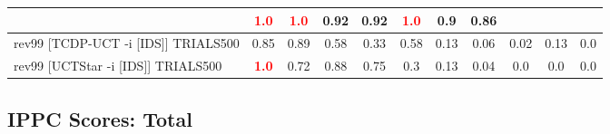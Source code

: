 \documentclass{article}
\begin{document}
\begin{tabular}{|l|r@{$\pm$}rr@{$\pm$}rr@{$\pm$}rr@{$\pm$}rr@{$\pm$}rr@{$\pm$}rr@{$\pm$}rr@{$\pm$}rr@{$\pm$}rr@{$\pm$}r|}
& \multicolumn{2}{c}{\textbf{\textcolor{red}{1.0}}}
& \multicolumn{2}{c}{\textbf{\textcolor{red}{1.0}}}
& \multicolumn{2}{c}{0.92}
& \multicolumn{2}{c}{0.92}
& \multicolumn{2}{c}{\textbf{\textcolor{red}{1.0}}}
& \multicolumn{2}{c}{0.9}
& \multicolumn{2}{c|}{0.86}
\\
\hline
rev99 [TCDP-UCT -i [IDS]] TRIALS500
& \multicolumn{2}{c}{0.85}
& \multicolumn{2}{c}{0.89}
& \multicolumn{2}{c}{0.58}
& \multicolumn{2}{c}{0.33}
& \multicolumn{2}{c}{0.58}
& \multicolumn{2}{c}{0.13}
& \multicolumn{2}{c}{0.06}
& \multicolumn{2}{c}{0.02}
& \multicolumn{2}{c}{0.13}
& \multicolumn{2}{c|}{0.0}
\\
rev99 [UCTStar -i [IDS]] TRIALS500
& \multicolumn{2}{c}{\textbf{\textcolor{red}{1.0}}}
& \multicolumn{2}{c}{0.72}
& \multicolumn{2}{c}{0.88}
& \multicolumn{2}{c}{0.75}
& \multicolumn{2}{c}{0.3}
& \multicolumn{2}{c}{0.13}
& \multicolumn{2}{c}{0.04}
& \multicolumn{2}{c}{0.0}
& \multicolumn{2}{c}{0.0}
& \multicolumn{2}{c|}{0.0}
\\
\hline
\end{tabular}%

\bigskip

\subsection*{IPPC Scores: Total}
\end{document}
